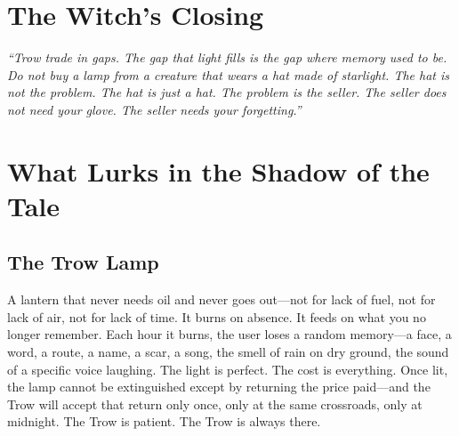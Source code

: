 \section*{The Witch's Closing}
\textit{``Trow trade in gaps. The gap that light fills is the gap where memory used to be. Do not buy a lamp from a creature that wears a hat made of starlight. The hat is not the problem. The hat is just a hat. The problem is the seller. The seller does not need your glove. The seller needs your forgetting.''}

\section*{What Lurks in the Shadow of the Tale}

\subsection*{The Trow Lamp}

A lantern that never needs oil and never goes out—not for lack of fuel, not for lack of air, not for lack of time. It burns on absence. It feeds on what you no longer remember. Each hour it burns, the user loses a random memory—a face, a word, a route, a name, a scar, a song, the smell of rain on dry ground, the sound of a specific voice laughing. The light is perfect. The cost is everything. Once lit, the lamp cannot be extinguished except by returning the price paid—and the Trow will accept that return only once, only at the same crossroads, only at midnight. The Trow is patient. The Trow is always there.

